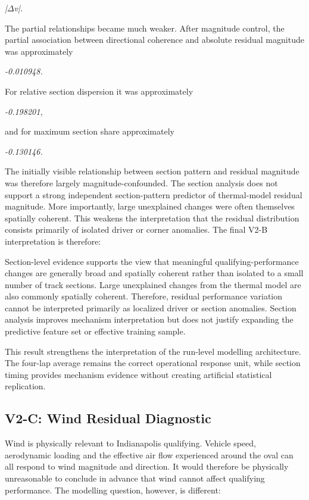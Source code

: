 \begin{center}\textit{|\ensuremath{\Delta}v|.}\end{center}

The partial relationships became much weaker. After magnitude control, the partial association between directional coherence and absolute residual magnitude was approximately

\begin{center}\textit{-0.010948.}\end{center}

For relative section dispersion it was approximately

\begin{center}\textit{-0.198201,}\end{center}

and for maximum section share approximately

\begin{center}\textit{-0.130146.}\end{center}

The initially visible relationship between section pattern and residual magnitude was therefore largely magnitude-confounded. The section analysis does not support a strong independent section-pattern predictor of thermal-model residual magnitude. More importantly, large unexplained changes were often themselves spatially coherent. This weakens the interpretation that the residual distribution consists primarily of isolated driver or corner anomalies. The final V2-B interpretation is therefore:

Section-level evidence supports the view that meaningful qualifying-performance changes are generally broad and spatially coherent rather than isolated to a small number of track sections. Large unexplained changes from the thermal model are also commonly spatially coherent. Therefore, residual performance variation cannot be interpreted primarily as localized driver or section anomalies. Section analysis improves mechanism interpretation but does not justify expanding the predictive feature set or effective training sample.

This result strengthens the interpretation of the run-level modelling architecture. The four-lap average remains the correct operational response unit, while section timing provides mechanism evidence without creating artificial statistical replication.

\subsection{V2-C: Wind Residual Diagnostic}
Wind is physically relevant to Indianapolis qualifying. Vehicle speed, aerodynamic loading and the effective air flow experienced around the oval can all respond to wind magnitude and direction. It would therefore be physically unreasonable to conclude in advance that wind cannot affect qualifying performance. The modelling question, however, is different:


